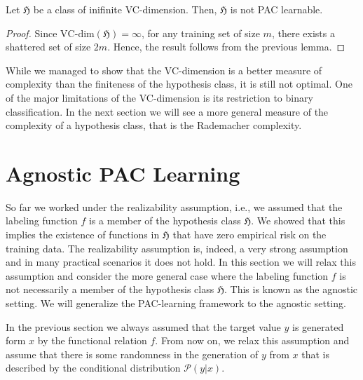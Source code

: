 	\begin{coro}
	Let $\mathfrak{H}$ be a class of inifinite VC-dimension. Then,
	$\mathfrak{H}$ is not PAC learnable.
	\end{coro}
\begin{proof}
	Since $\text{VC-dim}(\mathfrak{H})=\infty$, for any training set of size
	$m$, there exists a shattered set of size $2m$. Hence, the result follows
	from the previous lemma.
\end{proof}
While we managed to show that the VC-dimension is a better measure of complexity
than the finiteness of the hypothesis class, it is still not optimal. One of the
major limitations of the VC-dimension is its restriction to binary
classification. In the next section we will see a more general measure of the
complexity of a hypothesis class, that is the Rademacher complexity.
\section{Agnostic PAC Learning}
So far we worked under the realizability assumption, i.e., we assumed that the labeling function $f$ is a member
of the hypothesis class $\mathfrak{H}$. We showed that this implies the
existence of functions in $\mathfrak{H}$ that have zero empirical risk on the
training data. The realizability assumption is, indeed, a very strong
assumption and in many practical scenarios it does not hold. In this section we
will relax this assumption and consider the more general case where the labeling
function $f$ is not necessarily a member of the hypothesis class $\mathfrak{H}$.
This is known as the agnostic setting. We will generalize the
PAC-learning framework to the agnostic setting.

In the previous section we always assumed that the target value $y$ is generated form $x$ by the
functional relation $f$. From now on, we relax this assumption and assume that
there is some randomness in the generation of $y$ from $x$ that is described by
the conditional distribution $\mathcal{P}(y|x)$. 

